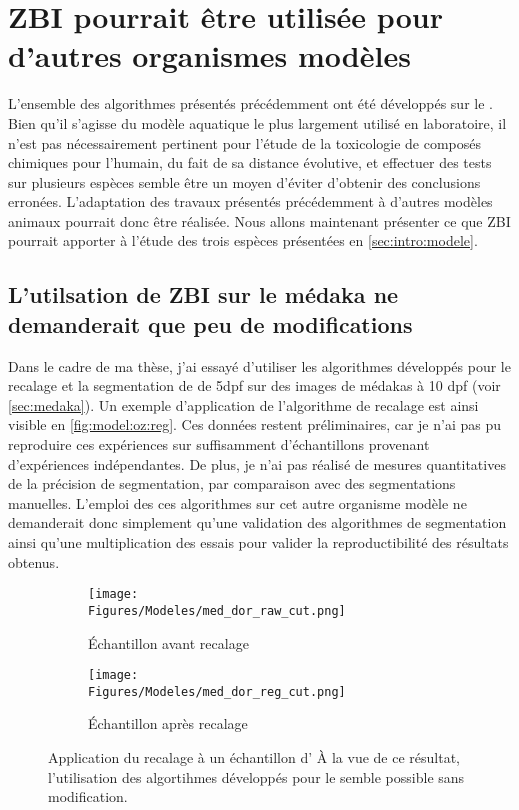 \documentclass[\main/main.tex]{subfiles}
\begin{document}
                    
\section{\label{sec:modeles}ZBI pourrait être utilisée pour d'autres organismes modèles}

%
L'ensemble des algorithmes présentés précédemment ont été développés sur le \pz.
%
Bien qu'il s'agisse du modèle aquatique le plus largement utilisé en laboratoire, il n'est pas nécessairement pertinent pour l'étude de la toxicologie de composés chimiques pour l'humain, du fait de sa distance évolutive, et effectuer des tests sur plusieurs espèces semble être un moyen d'éviter d'obtenir des conclusions erronées.
%
L'adaptation des travaux présentés précédemment à d'autres modèles animaux pourrait donc être réalisée.
%
Nous allons maintenant présenter ce que ZBI pourrait apporter à l'étude des trois espèces présentées en \autoref{sec:intro:modele}.

    \subsection{L'utilsation de ZBI sur le médaka ne demanderait que peu de modifications}

%
Dans le cadre de ma thèse, j'ai essayé d'utiliser les algorithmes développés pour le recalage
et la segmentation de \pz{} de 5dpf sur des images de médakas à 10 dpf (voir \autoref{sec:medaka}).
%
Un exemple d'application de l'algorithme de recalage est ainsi visible en \autoref{fig:model:oz:reg}.
%
Ces données restent préliminaires, car je n'ai pas pu reproduire ces expériences sur suffisamment d'échantillons provenant d'expériences indépendantes. De plus, je n'ai pas réalisé de mesures quantitatives de la précision de segmentation, par comparaison avec des segmentations manuelles.
%
L'emploi des ces algorithmes sur cet autre organisme modèle ne demanderait donc simplement qu'une validation des algorithmes de segmentation ainsi qu'une multiplication des essais pour valider la reproductibilité des résultats obtenus.

\begin{figure}[h!]
    \centering
    \begin{subfigure}[b]{0.475\textwidth}
       \caption{
            Échantillon avant recalage
            }
       \centering \texttt{[image: \\Figures/Modeles/med\_dor\_raw\_cut.png]}
    \end{subfigure}
    \begin{subfigure}[b]{0.475\textwidth}
       \caption{
            Échantillon après recalage
            }
       \centering \texttt{[image: \\Figures/Modeles/med\_dor\_reg\_cut.png]}
    \end{subfigure}
    \caption{
        \label{fig:model:oz:reg}
        Application du recalage à un échantillon d'\ol{}\newline
        À la vue de ce résultat, l'utilisation des algortihmes développés pour le \pz{} semble possible sans modification.
        }
\end{figure}
\end{document}
